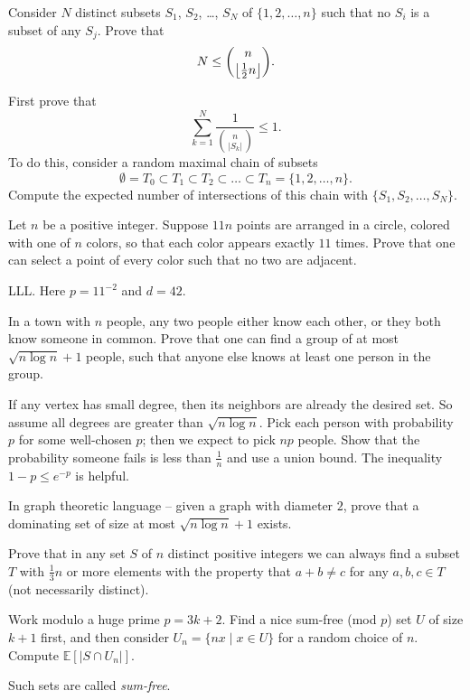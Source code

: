 \documentclass[11pt]{scrartcl}
\newcommand\EE{\mathbb E}
\begin{document}
\begin{problem}
	[Sperner] Consider $N$ distinct subsets $S_1$, $S_2$, \dots, $S_N$ of $\{1,2,\dots,n\}$ such that no $S_i$
	is a subset of any $S_j$.
	Prove that
	\[ N \le \binom{n}{\left\lfloor \frac{1}{2} n \right\rfloor}. \]
	\begin{sketch}
		First prove that \[ \sum_{k=1}^N \frac{1}{\binom{n}{\left\lvert S_k \right\rvert}} \le 1. \]
		To do this, consider a random maximal chain of subsets
		\[ \emptyset = T_0 \subset T_1 \subset T_2 \subset \dots \subset T_n = \{1,2,\dots,n\}. \]
		Compute the expected number of intersections of this chain with $\{S_1, S_2, \dots, S_N\}$.
	\end{sketch}
\end{problem}

\begin{problem}
	Let $n$ be a positive integer. Suppose $11n$ points are arranged in a circle,
	colored with one of $n$ colors, so that
	each color appears exactly $11$ times.
	Prove that one can select a point of every color such that no two are adjacent.
	\begin{sketch}
		LLL. Here $p = 11^{-2}$ and $d = 42$.
	\end{sketch}
\end{problem}

\begin{problem}
	In a town with $n$ people, any two people either know each other, or they both know someone in common.
	Prove that one can find a group of at most $\sqrt{n \log n} + 1$ people, such that anyone else knows
	at least one person in the group.
	\begin{sketch}
		If any vertex has small degree, then its neighbors are already the desired set.
		So assume all degrees are greater than $\sqrt{n \log n}$.
		Pick each person with probability $p$ for some well-chosen $p$; then we expect to pick $np$ people.
		Show that the probability someone fails is less than $\frac 1n$ and use a union bound.
		The inequality $1-p \le e^{-p}$ is helpful.
	\end{sketch}
\end{problem}
\begin{remark*}
	In graph theoretic language -- given a graph with diameter $2$, prove that a dominating set of
	size at most $\sqrt{n \log n} + 1$ exists.
\end{remark*}


\begin{problem}
	[Erd\"os] Prove that in any set $S$ of $n$ distinct positive integers
	we can always find a subset $T$ with $\frac 13n$ or more elements
	with the property that $a+b \neq c$ for any $a,b,c \in T$ (not necessarily distinct).
	\begin{sketch}
		Work modulo a huge prime $p=3k+2$.
		Find a nice sum-free (mod $p$) set $U$ of size $k+1$ first,
		and then consider $U_n = \{ nx \mid x \in U \}$ for a random choice of $n$.
		Compute $\EE[\left\lvert S \cap U_n \right\rvert]$.
	\end{sketch}
\end{problem}
\begin{remark*}
	Such sets are called \emph{sum-free}.
\end{remark*}
\end{document}
